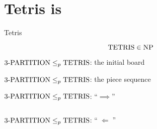 \section{Tetris is \npc{}}

\begin{frame}{Tetris}
\end{frame}
\begin{frame}{\tetris}
  \begin{definition}
  \end{definition}

  \[
	\text{TETRIS} \in \text{NP}
  \]
\end{frame}
\begin{frame}{\partition}
  \begin{definition}[\partition]
  \end{definition}
\end{frame}
\begin{frame}{$\text{3-PARTITION} \le_{p} \text{TETRIS}$: the initial board}
\end{frame}
\begin{frame}{$\text{3-PARTITION} \le_{p} \text{TETRIS}$: the piece sequence}
\end{frame}
\begin{frame}{$\text{3-PARTITION} \le_{p} \text{TETRIS}$: ``$\implies$''}
  \begin{columns}
  \end{columns}
\end{frame}
\begin{frame}{$\text{3-PARTITION} \le_{p} \text{TETRIS}$: ``$\;\Longleftarrow\;$''}
\end{frame}
